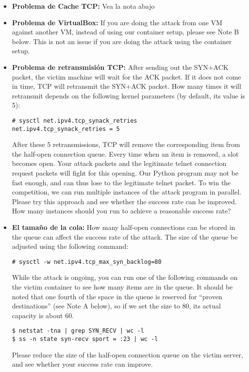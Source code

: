 \begin{itemize}
  \item \textbf{Problema de Cache TCP:} Vea la nota abajo

  \item \textbf{Problema de VirtualBox:} If you are doing the attack from one VM against another VM, 
    instead of using our container setup, please see Note B below. This is not an issue
    if you are doing the attack using the container setup.

  \item \textbf{Problema de retransmisión TCP:} 
    After sending out the SYN+ACK packet, the victim machine will wait for 
    the ACK packet. If it does not come in time, TCP will retransmit the SYN+ACK packet. 
    How many times it will retransmit depends on the following kernel parameters (by default,
    its value is 5):
    
\begin{lstlisting}
# sysctl net.ipv4.tcp_synack_retries
net.ipv4.tcp_synack_retries = 5
\end{lstlisting}

    After these 5 retransmissions, TCP will remove the corresponding item
    from the half-open connection queue. Every time when an item is removed,
    a slot becomes open. Your attack packets and the legitimate 
    telnet connection request packets will fight for this opening.
    Our Python program may not be fast enough, and can thus lose to 
    the legitimate telnet packet. To win the competition, we can run multiple instances
    of the attack program in parallel. Please try this approach and 
    see whether the success rate can be improved. How many instances 
    should you run to achieve a reasonable success rate? 

  \item \textbf{El tamaño de la cola:}  
    How many half-open connections can be stored in the queue
    can affect the success rate of the attack. 
    The size of the queue be adjusted using the following command:

\begin{lstlisting}
# sysctl -w net.ipv4.tcp_max_syn_backlog=80
\end{lstlisting}
     
    While the attack is ongoing, you can run one of the following commands 
    on the victim container to see
    how many items are in the queue. It should be noted that one fourth of the 
    space in the queue is reserved for ``proven destinations'' (see Note A below), 
    so if we set the size to 80, its actual capacity is about 60. 

\begin{lstlisting}
$ netstat -tna | grep SYN_RECV | wc -l
$ ss -n state syn-recv sport = :23 | wc -l
\end{lstlisting}

    Please reduce the size of the half-open connection queue on the 
    victim server, and see whether your success rate can improve. 
\end{itemize}


